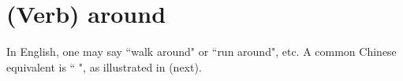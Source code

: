 

\section{(Verb) around}
\hfill
\begin{minipage}{\tw-60mm}
In English, one may say ``walk around" or ``run around", etc.
A common Chinese equivalent is ``\blank {} \blank {}",
as illustrated in  (next).
\end{minipage}\hfill
{}

